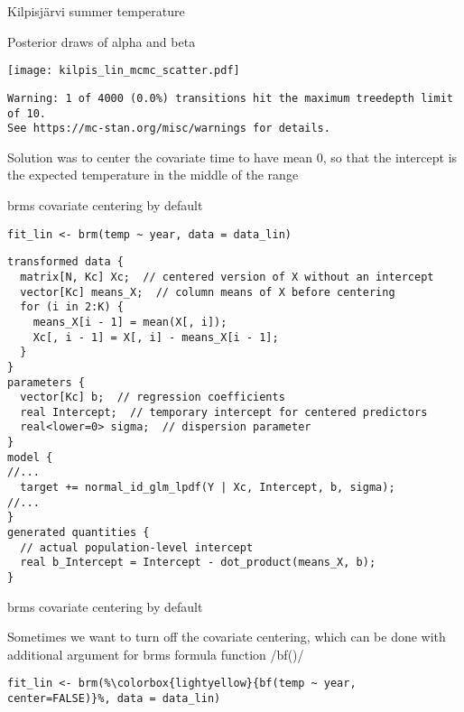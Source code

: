 \documentclass[finnish,english,t]{beamer}
\begin{document}
\begin{frame}[fragile]{Kilpisjärvi summer temperature}
  
  Posterior draws of alpha and beta
  
  \begin{center}
    \texttt{[image: kilpis\_lin\_mcmc\_scatter.pdf]}
  \end{center}

\scriptsize
\begin{verbatim}
Warning: 1 of 4000 (0.0%) transitions hit the maximum treedepth limit of 10.
See https://mc-stan.org/misc/warnings for details.
\end{verbatim}
\pause
\small
Solution was to center the covariate time to have mean 0, so that the
intercept is the expected temperature in the middle of the range
  
\end{frame}

\begin{frame}{brms covariate centering by default}

  \vspace{-0.75\baselineskip}
\begin{verbatim}
fit_lin <- brm(temp ~ year, data = data_lin)
\end{verbatim}
\pause
\begin{verbatim}
transformed data {
  matrix[N, Kc] Xc;  // centered version of X without an intercept
  vector[Kc] means_X;  // column means of X before centering
  for (i in 2:K) {
    means_X[i - 1] = mean(X[, i]);
    Xc[, i - 1] = X[, i] - means_X[i - 1];
  }
}
parameters {
  vector[Kc] b;  // regression coefficients
  real Intercept;  // temporary intercept for centered predictors
  real<lower=0> sigma;  // dispersion parameter
}
model {
//...
  target += normal_id_glm_lpdf(Y | Xc, Intercept, b, sigma);
//...
}
generated quantities {
  // actual population-level intercept
  real b_Intercept = Intercept - dot_product(means_X, b);
}
\end{verbatim}

\end{frame}

\begin{frame}{brms covariate centering by default}

  Sometimes we want to turn off the covariate centering, which can be
  done with additional argument for brms formula function
  \rinline/bf()/

\begin{verbatim}
fit_lin <- brm(%\colorbox{lightyellow}{bf(temp ~ year, center=FALSE)}%, data = data_lin)
\end{verbatim}

\end{frame}
\end{document}
